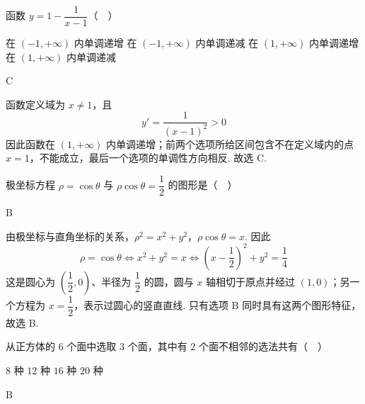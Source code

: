 \begin{problem}
函数 \(y = 1 - \dfrac{1}{x - 1}\)（\(\quad\)）

\choices
    {在 \((-1, +\infty)\) 内单调递增}
    {在 \((-1, +\infty)\) 内单调递减}
    {在 \((1, +\infty)\) 内单调递增}
    {在 \((1, +\infty)\) 内单调递减}
\end{problem}

\begin{answer}
C
\end{answer}

\begin{solution}
函数定义域为 \(x\ne1\)，且
\[
y'=\frac{1}{(x-1)^2}>0
\]
因此函数在 \((1,+\infty)\) 内单调递增；前两个选项所给区间包含不在定义域内的点 \(x=1\)，不能成立，最后一个选项的单调性方向相反. 故选 C.
\end{solution}

\begin{problem}
极坐标方程 \(\rho = \cos \theta\) 与 \(\rho \cos \theta = \dfrac{1}{2}\) 的图形是（\(\quad\)）

    {}
    {}
    {}
\end{problem}

\begin{answer}
B
\end{answer}

\begin{solution}
由极坐标与直角坐标的关系，\(\rho^2=x^2+y^2\)，\(\rho\cos\theta=x\). 因此
\[
\rho=\cos\theta\Longleftrightarrow x^2+y^2=x
\Longleftrightarrow \left(x-\frac12\right)^2+y^2=\frac14
\]
这是圆心为 \(\left(\dfrac12,0\right)\)、半径为 \(\dfrac12\) 的圆，圆与 \(x\) 轴相切于原点并经过 \((1,0)\)；另一个方程为 \(x=\dfrac12\)，表示过圆心的竖直直线. 只有选项 B 同时具有这两个图形特征，故选 B.
\end{solution}

\begin{problem}
从正方体的 \(6\) 个面中选取 \(3\) 个面，其中有 \(2\) 个面不相邻的选法共有（\(\quad\)）

\choices
    {\(8\) 种}
    {\(12\) 种}
    {\(16\) 种}
    {\(20\) 种}
\end{problem}

\begin{answer}
B
\end{answer}

